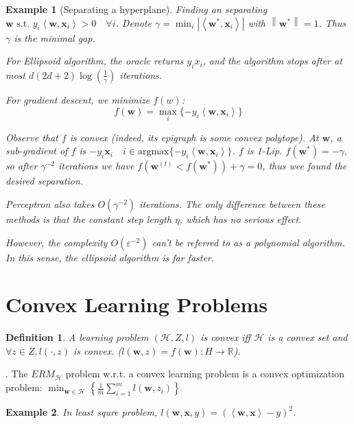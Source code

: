 \documentclass{book}
\newcommand{\R}{\mathbb{R}}
\newcommand{\st}{\text{ s.t. }}
\newcommand{\nm}[1]{\left\|#1\right\|}
\newcommand{\dual}[1]{\left<#1\right>}
\renewcommand{\H}{\mathcal{H}}
\newtheorem{Def}{Definition}[section]
\newtheorem{Eg}{Example}[section]
\begin{document}
\begin{Eg}[Separating a hyperplane]
  Finding an separating $\mathbf{w}\st y_{i}\dual{\mathbf{w},\mathbf{x}_{i}}>0 \quad\forall i$. Denote $\gamma=\min_{i}|\dual{\mathbf{w}^{*},\mathbf{x}_{i}}|$ with $\nm{\mathbf{w}^{*}}=1$. Thus $\gamma$ is the minimal gap.

  For Ellipsoid algorithm, the oracle returns $y_{i}x_{i}$, and the algorithm stops after at most $d \left( 2d+2 \right)\log \left( \frac{1}{\gamma} \right)$ iterations.

  For gradient descent, we minimize $f(w)$:
  \[f(\mathbf{w})=\max_{i}\{-y_{i}\dual{\mathbf{w},\mathbf{x}_{i}}\}\]

  Observe that $f$ is convex (indeed, its epigraph is some convex polytope). At $\mathbf{w}$, a sub-gradient of $f$ is $-y_{i}\mathbf{x}_{i}\quad i\in\mathrm{argmax}\{-y_{i}\dual{\mathbf{w},\mathbf{x}_{i}}\}$. $f$ is 1-Lip. $f(\mathbf{w}^{*})=-\gamma,$ so after $\gamma^{-2}$ iterations we have $f(\mathbf{w}^{(t)}<f(\mathbf{w}^{*}))+\gamma=0$, thus wee found the desired separation.

  Perceptron also takes $O(\gamma^{-2})$ iterations. The only difference between these methods is that the constant step length $\eta$, which has no serious effect.

  However, the complexity $O(\varepsilon^{-2})$ can't be referred to as a polynomial algorithm. In this sense, the ellipsoid algorithm is far faster. 
\end{Eg}

\section{Convex Learning Problems}
\begin{Def}
  A learning problem $(\H,Z,l)$ is convex iff $\H$ is a convex set and $\forall z\in Z, l(\cdot,z)$ is convex. ($l(\mathbf{w},z)=f(\mathbf{w}): H\to \R$).
\end{Def}.
  The $ERM_{\H}$ problem w.r.t. a convex learning problem is a convex optimization problem: $\min_{\mathbf{w}\in\H}\left\{ \frac{1}{m}\sum_{i=1}^ml \left( \mathbf{w},z_i \right) \right\}$
\begin{Eg}
  In least squre problem, $l(\mathbf{w},\mathbf{x},y)=(\dual{\mathbf{w},\mathbf{x}}-y)^{2}$.
\end{Eg}
\end{document}
